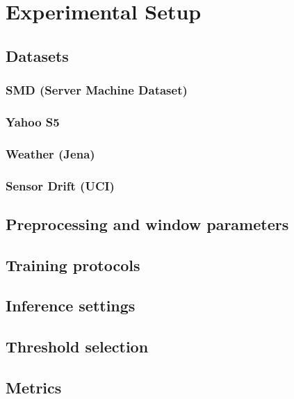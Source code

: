 \chapter{Experimental Setup}
\label{ch:experiments}

\section{Datasets}
\subsection{SMD (Server Machine Dataset)}
\subsection{Yahoo S5}
\subsection{Weather (Jena)}
\subsection{Sensor Drift (UCI)}

\section{Preprocessing and window parameters}

\section{Training protocols}

\section{Inference settings}

\section{Threshold selection}

\section{Metrics}
